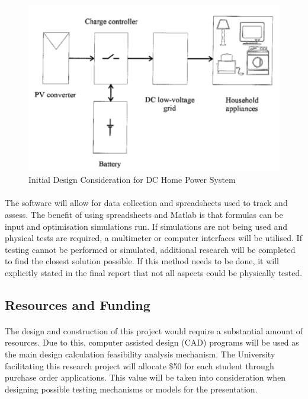 \begin{figure}[H]
\hfill\includegraphics[width = 120mm]{images/DC_Home}\hspace*{\fill}
\caption{Initial Design Consideration for DC Home Power System \cite{Pellis1997}} 
\label{fig:DCHomeSystem}
\end{figure} 

\paragraph{} 
The software will allow for data collection and spreadsheets used to track and assess. The benefit of using spreadsheets and Matlab is that formulas can be input and optimisation simulations run. If simulations are not being used and physical tests are required, a multimeter or computer interfaces will be utilised. If testing cannot be performed or simulated, additional research will be completed to find the closest solution possible. If this method needs to be done, it will explicitly stated in the final report that not all aspects could be physically tested.     


\subsection{Resources and Funding}

\paragraph{}
The design and construction of this project would require a substantial amount of resources. Due to this, computer assisted design (CAD) programs will be used as the main design calculation feasibility analysis mechanism. The University facilitating this research project will allocate \$50 for each student through purchase order applications. This value will be taken into consideration when designing possible testing mechanisms or models for the presentation. 

